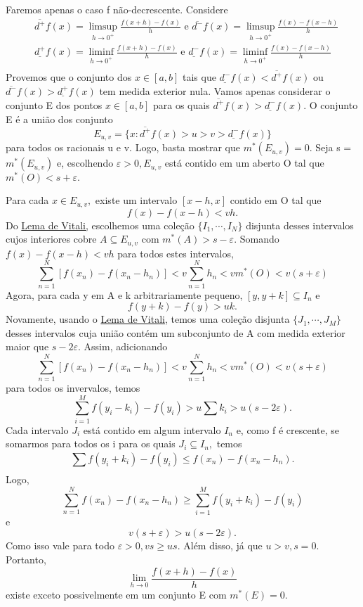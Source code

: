 \documentclass[analysis_notes.tex]{subfiles}
\begin{document}
\begin{proof*}
	Faremos apenas o caso f não-decrescente. Considere
	\begin{align*}
		 & \overline{d^{+}}f(x) = \limsup_{h\to 0^{+}} \frac{f(x+h)-f(x)}{h}\text{ e }\overline{d^{-}}f(x) = \limsup_{h\to 0^{+}}\frac{f(x) - f(x-h)}{h}   \\
		 & \underline{d^{+}}f(x) = \liminf_{h\to 0^{+}} \frac{f(x+h)-f(x)}{h}\text{ e }\underline{d^{-}}f(x) = \liminf_{h\to 0^{+}}\frac{f(x) - f(x-h)}{h} \\
	\end{align*}
	Provemos que o conjunto dos \(x\in[a, b]\) tais que \(\underline{d^{-}}f(x) < \overline{d^{+}}f(x)\)
	ou \(\overline{d^{-}}f(x) > \underline{d^{+}}f(x)\) tem medida exterior nula.
	Vamos apenas considerar o conjunto E dos pontos \(x\in[a, b]\) para os quais
	\(\overline{d^{+}}f(x) > \underline{d^{-}}f(x).\) O conjunto E é a união
	dos conjunto
	\[
		E_{u, v} = \{x: \overline{d^{+}}f(x) > u > v > \underline{d^{-}}f(x) \}
	\]
	para todos os racionais u e v. Logo, basta mostrar que \(m^{*}(E_{u, v}) = 0.\)
	Seja s = \(m^{*}(E_{u,v })\) e, escolhendo \(\varepsilon >0, E_{u, v}\) está contido
	em um aberto O tal que \(m^{*}(O) < s + \varepsilon .\)

	Para cada \(x\in E_{u, v},\) existe um intervalo \([x-h, x]\) contido em O tal que
	\[
		f(x) - f(x-h) < vh.
	\]
	Do \hyperlink{vitali_covering}{Lema de Vitali,} escolhemos uma cole\c cão \(\{I_{1}, \cdots, I_{N}\} \)
	disjunta desses intervalos cujos interiores cobre \(A\subseteq{E_{u, v}}\) com
	\(m^{*}(A) > s-\varepsilon .\) Somando \(f(x) - f(x-h) < vh\) para todos estes intervalos,
	\[
		\sum\limits_{n=1}^{N}[f(x_{n}) - f(x_{n}-h_{n})] < v \sum\limits_{n=1}^{N}h_{n} < vm^{*}(O) < v(s+\varepsilon )
	\]
	Agora, para cada y em A e k arbitrariamente pequeno, \([y, y+k]\subseteq{I_{n}}\) e
	\[
		f(y+k)-f(y) > uk.
	\]
	Novamente, usando o \hyperlink{vitali_covering}{Lema de Vitali,} temos uma cole\c cão
	disjunta \(\{J_{1}, \cdots, J_{M}\}\) desses intervalos cuja união contém um
	subconjunto de A com medida exterior maior que \(s-2\varepsilon .\) Assim,
	adicionando
	\[
		\sum\limits_{n=1}^{N}[f(x_{n}) - f(x_{n}-h_{n})] < v \sum\limits_{n=1}^{N}h_{n} < vm^{*}(O) < v(s+\varepsilon )
	\]
	para todos os invervalos, temos
	\[
		\sum\limits_{i=1}^{M}f(y_{i}-k_{i})-f(y_{i}) > u\sum k_{i} > u (s-2\varepsilon ).
	\]
	Cada intervalo \(J_{i}\) está contido em algum intervalo \(I_{n}\) e, como f é
	crescente, se somarmos para todos os i para os quais \(J_{i}\subseteq{I_{n}},\) temos
	\[
		\sum\limits_{}^{}f(y_{i}+k_{i}) - f(y_{i})\leq f(x_{n}) - f(x_{n}-h_{n}).
	\]
	Logo,
	\[
		\sum\limits_{n=1}^{N}f(x_{n})-f(x_{n}-h_{n})\geq \sum\limits_{i=1}^{M}f(y_{i}+k_{i}) - f(y_{i})
	\]
	e
	\[
		v(s+\varepsilon ) > u(s-2\varepsilon ).
	\]
	Como isso vale para todo \(\varepsilon >0, vs\geq us.\) Além disso, já que
	\(u > v, s=0.\) Portanto,
	\[
		\lim_{h\to 0}\frac{f(x+h)-f(x)}{h}
	\]
	existe exceto possivelmente em um conjunto E com \(m^{*}(E) = 0.\) \qedsymbol
\end{proof*}
\end{document}
